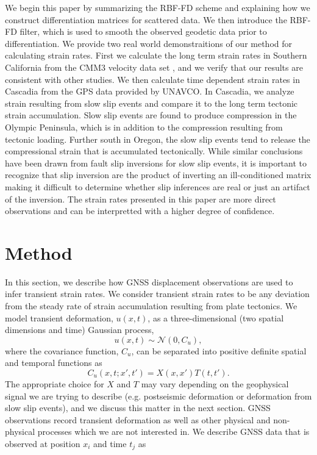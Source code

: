 \documentclass[10pt,a4paper]{article}
\begin{document}
We begin this paper by summarizing the RBF-FD scheme and explaining how we construct differentiation matrices for scattered data. We then introduce the RBF-FD filter, which is used to smooth the observed geodetic data prior to differentiation.  We provide two real world demonstraitions of our method for calculating strain rates.  First we calculate the long term strain rates in Southern California from the CMM3 velocity data set \citep{Shen2011}, and we verify that our results are consistent with other studies. We then calculate time dependent strain rates in Cascadia from the GPS data provided by UNAVCO.  In Cascadia, we analyze strain resulting from slow slip events and compare it to the long term tectonic strain accumulation. Slow slip events are found to produce compression in the Olympic Peninsula, which is in addition to the compression resulting from tectonic loading.  Further south in Oregon, the slow slip events tend to release the compressional strain that is accumulated tectonically.  While similar conclusions have been drawn from fault slip inversions for slow slip events, it is important to recognize that slip inversion are the product of inverting an ill-conditioned matrix making it difficult to determine whether slip inferences are real or just an artifact of the inversion.  The strain rates presented in this paper are more direct observations and can be interpretted with a higher degree of confidence. 

\section{Method}\label{sec:Method}

In this section, we describe how GNSS displacement observations are used to infer transient strain rates. We consider transient strain rates to be any deviation from the steady rate of strain accumulation resulting from plate tectonics. We model transient deformation, $u(x,t)$, as a three-dimensional (two spatial dimensions and time) Gaussian process,
\begin{equation}\label{eq:TransientDeformation}
u(x,t) \sim \mathcal{N}\left(0,C_u\right),
\end{equation}
where the covariance function, $C_u$, can be separated into positive definite spatial and temporal functions as 
\begin{equation}\label{eq:TransientCovariance}
C_u(x,t;x',t') = X(x,x')T(t,t').
\end{equation}  
The appropriate choice for $X$ and $T$ may vary depending on the geophysical signal we are trying to describe (e.g. postseismic deformation or deformation from slow slip events), and we discuss this matter in the next section.  GNSS observations record transient deformation as well as other physical and non-physical processes which we are not interested in. We describe GNSS data that is observed at position $x_i$ and time $t_j$ as   
\end{document}
